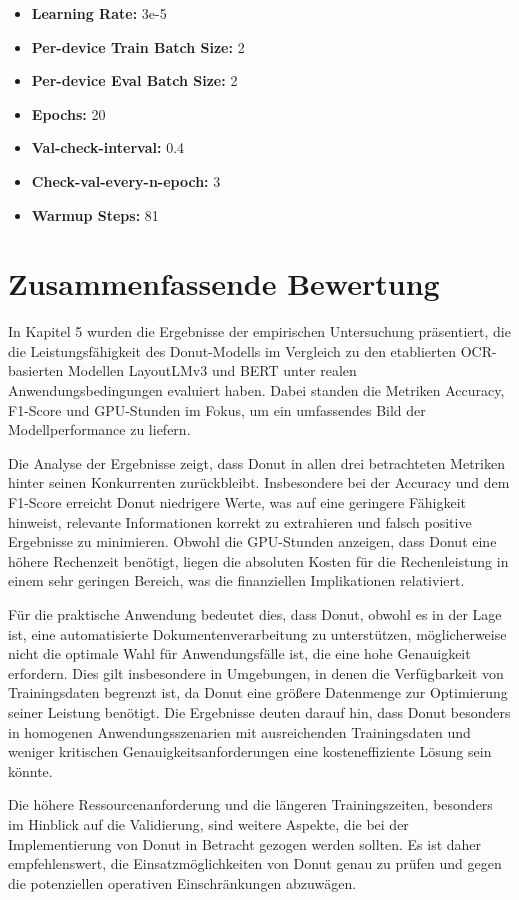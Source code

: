 \begin{itemize}
    \item \textbf{Learning Rate:} 3e-5
    \item \textbf{Per-device Train Batch Size:} 2
    \item \textbf{Per-device Eval Batch Size:} 2
    \item \textbf{Epochs:} 20
    \item \textbf{Val-check-interval:} 0.4
    \item \textbf{Check-val-every-n-epoch:} 3
    \item \textbf{Warmup Steps:} 81
\end{itemize}

\section{Zusammenfassende Bewertung}
In Kapitel 5 wurden die Ergebnisse der empirischen Untersuchung präsentiert, die die Leistungsfähigkeit des Donut-Modells im Vergleich zu den etablierten OCR-basierten Modellen LayoutLMv3 und BERT unter realen Anwendungsbedingungen evaluiert haben. Dabei standen die Metriken Accuracy, F1-Score und GPU-Stunden im Fokus, um ein umfassendes Bild der Modellperformance zu liefern.

Die Analyse der Ergebnisse zeigt, dass Donut in allen drei betrachteten Metriken hinter seinen Konkurrenten zurückbleibt. Insbesondere bei der Accuracy und dem F1-Score erreicht Donut niedrigere Werte, was auf eine geringere Fähigkeit hinweist, relevante Informationen korrekt zu extrahieren und falsch positive Ergebnisse zu minimieren. Obwohl die GPU-Stunden anzeigen, dass Donut eine höhere Rechenzeit benötigt, liegen die absoluten Kosten für die Rechenleistung in einem sehr geringen Bereich, was die finanziellen Implikationen relativiert.

Für die praktische Anwendung bedeutet dies, dass Donut, obwohl es in der Lage ist, eine automatisierte Dokumentenverarbeitung zu unterstützen, möglicherweise nicht die optimale Wahl für Anwendungsfälle ist, die eine hohe Genauigkeit erfordern. Dies gilt insbesondere in Umgebungen, in denen die Verfügbarkeit von Trainingsdaten begrenzt ist, da Donut eine größere Datenmenge zur Optimierung seiner Leistung benötigt. Die Ergebnisse deuten darauf hin, dass Donut besonders in homogenen Anwendungsszenarien mit ausreichenden Trainingsdaten und weniger kritischen Genauigkeitsanforderungen eine kosteneffiziente Lösung sein könnte.

Die höhere Ressourcenanforderung und die längeren Trainingszeiten, besonders im Hinblick auf die Validierung, sind weitere Aspekte, die bei der Implementierung von Donut in Betracht gezogen werden sollten. Es ist daher empfehlenswert, die Einsatzmöglichkeiten von Donut genau zu prüfen und gegen die potenziellen operativen Einschränkungen abzuwägen.

